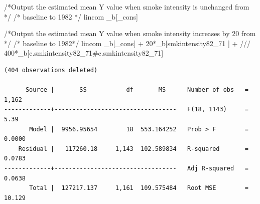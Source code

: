 \documentclass[
  10pt,
  a4paper,
]{book}
\newenvironment{Shaded}{\begin{snugshade}}{\end{snugshade}}
\newcommand{\CommentTok}[1]{\textcolor[rgb]{0.37,0.37,0.37}{#1}}
\newcommand{\DataTypeTok}[1]{\textcolor[rgb]{0.68,0.00,0.00}{#1}}
\newcommand{\KeywordTok}[1]{\textcolor[rgb]{0.00,0.46,0.62}{#1}}
\newcommand{\NormalTok}[1]{\textcolor[rgb]{0.00,0.46,0.62}{#1}}
\begin{document}
\begin{Shaded}
\begin{Highlighting}[]
\CommentTok{/*Output the estimated mean Y value when smoke intensity is unchanged from */}
\CommentTok{/* baseline to 1982 */}
\KeywordTok{lincom}\NormalTok{ \_b[}\DataTypeTok{\_cons}\NormalTok{]}

\CommentTok{/*Output the estimated mean Y value when smoke intensity increases by 20 from */}
\CommentTok{/* baseline to 1982*/}
\KeywordTok{lincom}\NormalTok{ \_b[}\DataTypeTok{\_cons}\NormalTok{] + 20*\_b[smkintensity82\_71 ] + }\CommentTok{///}
\NormalTok{  400*\_b[c.smkintensity82\_71\#c.smkintensity82\_71]}
\end{Highlighting}
\end{Shaded}

\begin{verbatim}
(404 observations deleted)

      Source |       SS           df       MS      Number of obs   =     1,162
-------------+----------------------------------   F(18, 1143)     =      5.39
       Model |  9956.95654        18  553.164252   Prob > F        =    0.0000
    Residual |   117260.18     1,143  102.589834   R-squared       =    0.0783
-------------+----------------------------------   Adj R-squared   =    0.0638
       Total |  127217.137     1,161  109.575484   Root MSE        =    10.129


\end{verbatim}
\end{document}
